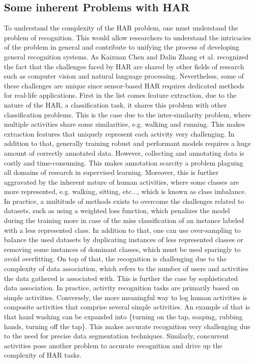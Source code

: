 \subsection{Some inherent Problems with HAR}\label{subsec:probHAR}
To understand the complexity of the HAR problem, one must understand the problem of recognition. This would allow researchers to understand the intricacies of the problem in general and contribute to unifying the process of developing general recognition systems. As Kaixuan Chen and Dalin Zhang et al. recognized the fact that the challenges faced by HAR are shared by other fields of research such as computer vision and natural language processing\cite{chen2021deep}. Nevertheless, some of these challenges are unique since sensor-based HAR requires dedicated methods for real-life applications.\newline
First in the list comes feature extraction, due to the nature of the HAR, a classification task, it shares this problem with other classification problems. This is the case due to the inter-similarity problem, where multiple activities share some similarities, e.g. walking and running. This makes extraction features that uniquely represent each activity very challenging. In addition to that, generally training robust and performant models requires a huge amount of correctly annotated data. However, collecting and annotating data is costly and time-consuming. This makes annotation scarcity a problem plaguing all domains of research in supervised learning. Moreover, this is further aggravated by the inherent nature of human activities, where some classes are more represented, e.g. walking, sitting, etc..., which is known as class imbalance. In practice, a multitude of methods exists to overcome the challenges related to datasets, such as using a weighted loss function, which penalizes the model during the training more in case of the miss classification of an instance labeled with a less represented class. In addition to that, one can use over-sampling to balance the used datasets by duplicating instances of less represented classes or removing some instances of dominant classes, which must be used sparingly to avoid overfitting\cite{chen2021deep}.\newline
On top of that, the recognition is challenging due to the complexity of data association, which refers to the number of users and activities the data gathered is associated with. This is further the case by sophisticated data association. In practice, activity recognition tasks are primarily based on simple activities. Conversely, the more meaningful way to log human activities is composite activities that comprise several simple activities. An example of that is that hand washing can be expanded into \{turning on the tap, soaping, rubbing hands, turning off the tap\}\cite{chen2021deep}. This makes accurate recognition very challenging due to the need for precise data segmentation techniques. Similarly, concurrent activities pose another problem to accurate recognition and drive up the complexity of HAR tasks.\newline
